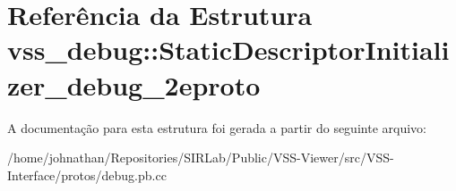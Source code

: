 \hypertarget{structvss__debug_1_1StaticDescriptorInitializer__debug__2eproto}{}\section{Referência da Estrutura vss\+\_\+debug\+:\+:Static\+Descriptor\+Initializer\+\_\+debug\+\_\+2eproto}
\label{structvss__debug_1_1StaticDescriptorInitializer__debug__2eproto}


A documentação para esta estrutura foi gerada a partir do seguinte arquivo\+:\begin{DoxyCompactItemize}
\item 
/home/johnathan/\+Repositories/\+S\+I\+R\+Lab/\+Public/\+V\+S\+S-\/\+Viewer/src/\+V\+S\+S-\/\+Interface/protos/debug.\+pb.\+cc\end{DoxyCompactItemize}

